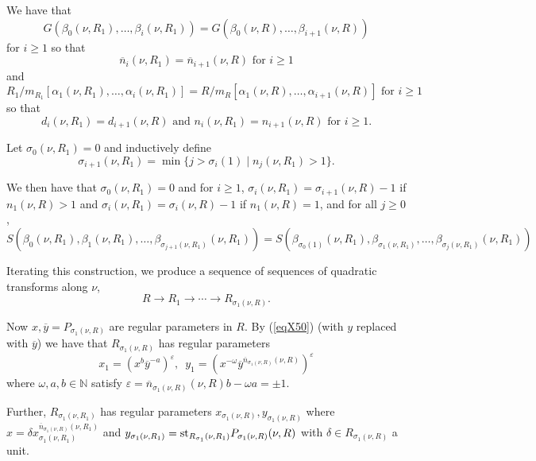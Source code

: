\documentclass[11pt]{amsart}
\def\NZQ{\mathbb}               %
\def\NN{{\NZQ N}}
\let\epsilon\varepsilon
\begin{document}
We have that
$$
G(\beta_0(\nu,R_1),\ldots,\beta_i(\nu, R_1))=G(\beta_0(\nu,R),\ldots,\beta_{i+1}(\nu,R))
$$
for $i\ge 1$ so that 
$$
\overline n_i(\nu,R_1)=\overline n_{i+1}(\nu,R)\mbox{ for }i\ge 1
$$ 
and
$$
R_1/m_{R_1}[\alpha_1(\nu,R_1),\ldots,\alpha_i(\nu,R_1)]=R/m_R[\alpha_1(\nu,R),\ldots,\alpha_{i+1}(\nu,R)]\mbox{ for }i\ge 1
$$
so that 
$$
d_i(\nu,R_1)=d_{i+1}(\nu,R)\mbox{ and }n_{i}(\nu,R_1)=n_{i+1}(\nu,R)\mbox{ for }i\ge 1.
$$

Let $\sigma_0(\nu,R_1)=0$ and inductively define 
    $$
    \sigma_{i+1}(\nu,R_1)=\min\{j>\sigma_i(1)\mid n_j(\nu,R_1)>1\}.
    $$
    
    
    We then have that 
    $\sigma_0(\nu,R_1)=0$ and for $i\ge 1$,  $\sigma_i(\nu,R_1)=\sigma_{i+1}(\nu,R)-1$ if $n_1(\nu,R)>1$ and $\sigma_i(\nu,R_1)=\sigma_i(\nu,R)-1$ if $n_1(\nu,R)=1$, and for all $j\ge 0$,
    $$
    S(\beta_0(\nu,R_1),\beta_1(\nu,R_1),\ldots,\beta_{\sigma_{j+1}(\nu,R_1)}(\nu,R_1))=S(\beta_{\sigma_0(1)}(\nu,R_1),\beta_{\sigma_1(\nu,R_1)},\ldots,\beta_{\sigma_j(\nu,R_1)}(\nu,R_1))
    $$

 Iterating this construction, we produce a sequence of sequences of quadratic transforms along $\nu$,
    $$
    R\rightarrow R_1\rightarrow \cdots\rightarrow R_{\sigma_1(\nu,R)}.
    $$
    
 Now $x, \overline y=P_{\sigma_1(\nu,R)}$ are regular parameters in $R$. By (\ref{eqX50}) (with $y$ replaced with $\overline y$) we have that $R_{\sigma_1(\nu,R)}$ has regular parameters
 \begin{equation}\label{eq8}
 x_1=(x^b\overline y^{-a})^{\epsilon},\,\,\,
 y_1=(x^{-\omega}\overline y^{\overline n_{\sigma_1(\nu,R)}(\nu,R)})^{\epsilon}
 \end{equation}
 where $\omega,a,b\in \NN$ satisfy
 $\epsilon=\overline n_{\sigma_1(\nu,R)}(\nu,R)b-\omega a=\pm 1$.
 
 
  
 
 Further, $R_{\sigma_1(\nu,R_1)}$ has regular parameters $x_{\sigma_1(\nu,R)}, y_{\sigma_1(\nu,R)}$ where $x=\delta x_{\sigma_1(\nu,R_1)}^{\overline n_{\sigma_1(\nu,R)}(\nu,R_1)}$ and $y_{\sigma_1(\nu,R_1)}={\rm st}_{R_{\sigma_1}(\nu,R_1)}P_{\sigma_1(\nu,R)}(\nu,R)$ with $\delta\in R_{\sigma_1(\nu,R)}$ a unit.
  
\end{document}
